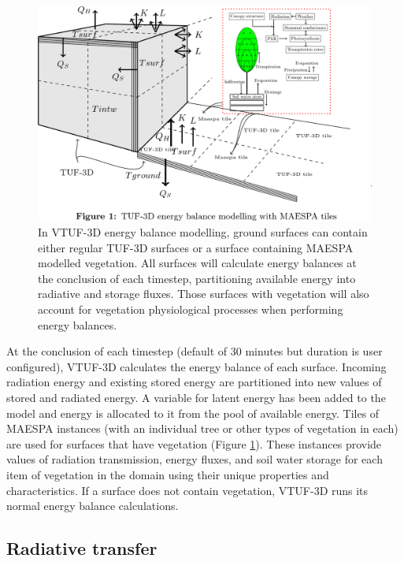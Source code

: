 \documentclass[final,3p,times,authoryear]{elsarticle}
\begin{document}
\begin{figure}[!htbp]
 \includegraphics[trim = 0mm 14mm 22mm 0.0mm, clip, scale=0.25]{images/TUFWithMaespaInsert.png}
 \caption{\label{fig:TUFWithMaespaInsert} In VTUF-3D energy balance modelling, ground surfaces can contain either regular TUF-3D surfaces or a surface containing MAESPA modelled vegetation. All surfaces will calculate energy balances at the conclusion of each timestep, partitioning available energy into radiative and storage fluxes. Those surfaces with vegetation will also account for vegetation physiological processes when performing energy balances.}
\end{figure}

At the conclusion of each timestep (default of 30 minutes but duration is user configured), VTUF-3D calculates the energy balance of each surface. Incoming radiation energy and existing stored energy are partitioned into new values of stored and radiated energy. A variable for latent energy has been added to the model and energy is allocated to it from the pool of available energy. Tiles of MAESPA instances (with an individual tree or other types of vegetation in each) are used for surfaces that have vegetation (Figure \ref{fig:TUFWithMaespaInsert}). These instances provide values of radiation transmission, energy fluxes, and soil water storage for each item of vegetation in the domain using their unique properties and characteristics. If a surface does not contain vegetation, VTUF-3D runs its normal energy balance calculations.



\subsection{Radiative transfer}\label{sec:radiativetransfer}
\end{document}
